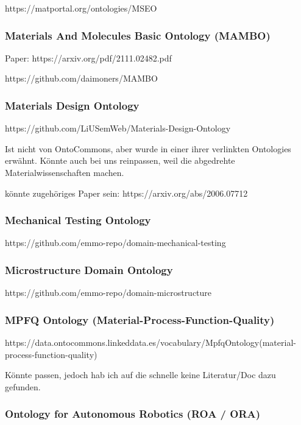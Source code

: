 \documentclass{article}
\begin{document}
https://matportal.org/ontologies/MSEO

\subsubsection{Materials And Molecules Basic Ontology (MAMBO)}

Paper: https://arxiv.org/pdf/2111.02482.pdf

https://github.com/daimoners/MAMBO

\subsubsection{Materials Design Ontology}

https://github.com/LiUSemWeb/Materials-Design-Ontology

Ist nicht von OntoCommons, aber wurde in einer ihrer verlinkten Ontologies erwähnt.
Könnte auch bei uns reinpassen, weil die abgedrehte Materialwissenschaften machen.

könnte zugehöriges Paper sein: https://arxiv.org/abs/2006.07712

\subsubsection{Mechanical Testing Ontology}

https://github.com/emmo-repo/domain-mechanical-testing

\subsubsection{Microstructure Domain Ontology}

https://github.com/emmo-repo/domain-microstructure

\subsubsection{MPFQ Ontology (Material-Process-Function-Quality)}

https://data.ontocommons.linkeddata.es/vocabulary/MpfqOntology(material-process-function-quality)

Könnte passen, jedoch hab ich auf die schnelle keine Literatur/Doc dazu gefunden.

\subsubsection{Ontology for Autonomous Robotics (ROA / ORA)}
\end{document}
